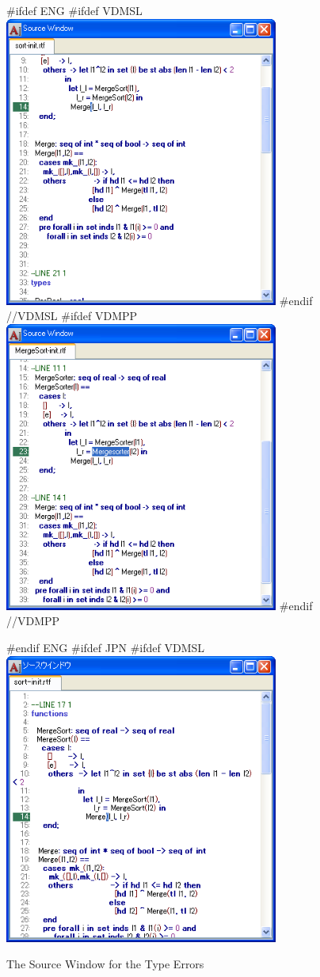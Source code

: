 \documentclass[\pformat,12pt]{article}
\begin{document}
\begin{figure}[tbh]
\begin{center}
#ifdef ENG
#ifdef VDMSL
\includegraphics[width=9cm]{sourceWindow-type-slENG.png}
#endif //VDMSL
#ifdef VDMPP
\includegraphics[width=9cm]{sourceWindow-type-ppENG.png}
#endif //VDMPP
\caption{The Source Window for the Type Errors}
#endif ENG
#ifdef JPN
#ifdef VDMSL
\includegraphics[width=9cm]{sourceWindow-type-sl.png}

\end{center}
\end{figure}
\end{document}
